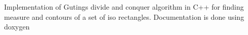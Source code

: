 Implementation of Guting\textquotesingle{}s divide and conquer algorithm in C++ for finding measure and contours of a set of iso rectangles. Documentation is done using doxygen 